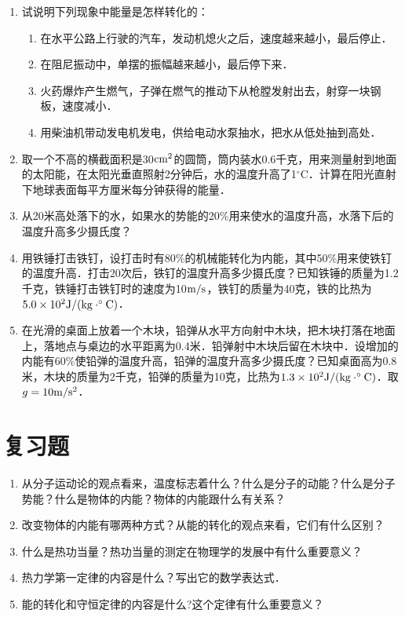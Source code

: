 \begin{enumerate}
\item 试说明下列现象中能量是怎样转化的：
\begin{enumerate}
    \item 在水平公路上行驶的汽车，发动机熄火之后，速度越来越小，最后停止．
    \item 在阻尼振动中，单摆的振幅越来越小，最后停下来．
    \item 火药爆炸产生燃气，子弹在燃气的推动下从枪膛发射出去，射穿一块钢板，速度减小．
    \item 用柴油机带动发电机发电，供给电动水泵抽水，把水从低处抽到高处．
\end{enumerate}

\item 取一个不高的横截面积是30${\rm cm^2}$的圆筒，筒内装水0.6千克，用来测量射到地面的太阳能，在太阳光垂直照射2分钟后，水的温度升高了1$^\circ$C．计算在阳光直射下地球表面每平方厘米每分钟获得的能量．
\item 从20米高处落下的水，如果水的势能的20\%用来使水的温度升高，水落下后的温度升高多少摄氏度？
\item 用铁锤打击铁钉，设打击时有80\%的机械能转化为内能，其中50\%用来使铁钉的温度升高．打击20次后，铁钉的温度升高多少摄氏度？已知铁锤的质量为1.2千克，铁锤打击铁钉时的速度为10${\rm m/s}$，铁钉的质量为40克，铁的比热为$5.0\times 10^2 {\rm J}/({\rm kg\cdot ^\circ C})$．

\item 在光滑的桌面上放着一个木块，铅弹从水平方向射中木块，把木块打落在地面上，落地点与桌边的水平距离为0.4米．铅弹射中木块后留在木块中．设增加的内能有60\%使铅弹的温度升高，铅弹的温度升高多少摄氏度？已知桌面高为0.8米，木块的质量为2千克，铅弹的质量为10克，比热为$1.3\times 10^2 {\rm J}/({\rm kg\cdot ^\circ C})$．取$g=10{\rm m}/{\rm s^2}$．

\end{enumerate}

\section*{复习题}
\begin{enumerate}
\item 从分子运动论的观点看来，温度标志着什么？什么是分子的动能？什么是分子势能？什么是物体的内能？物体的内能跟什么有关系？
\item 改变物体的内能有哪两种方式？从能的转化的观点来看，它们有什么区别？
\item 什么是热功当量？热功当量的测定在物理学的发展中有什么重要意义？
\item 热力学第一定律的内容是什么？写出它的数学表达式．
\item 能的转化和守恒定律的内容是什么?这个定律有什么重要意义？
\end{enumerate}




